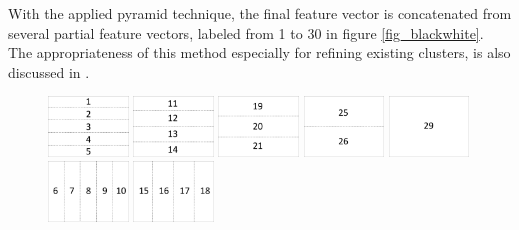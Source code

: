 With the applied pyramid technique, the final feature vector is concatenated from several partial feature vectors, labeled from 1 to 30 in figure \ref{fig_blackwhite}. The appropriateness of this method especially for refining existing clusters, is also discussed in \cite{Lazebnik2006}.

\begin{figure}[h]
\centering
\includegraphics[width=0.19\textwidth]{images/partitioning5h.pdf}
\includegraphics[width=0.19\textwidth]{images/partitioning4h.pdf}
\includegraphics[width=0.19\textwidth]{images/partitioning3h.pdf}
\includegraphics[width=0.19\textwidth]{images/partitioning2h.pdf}
\includegraphics[width=0.19\textwidth]{images/partitioning1h.pdf}\vspace{1mm}
\includegraphics[width=0.19\textwidth]{images/partitioning5v.pdf}
\includegraphics[width=0.19\textwidth]{images/partitioning4v.pdf}

\end{figure}
